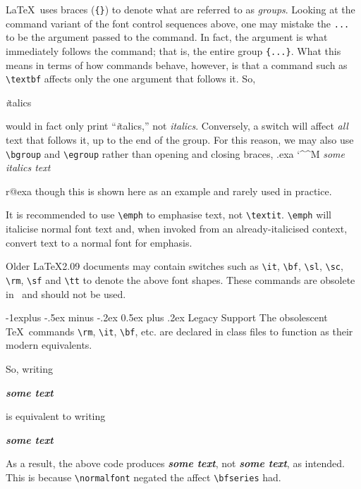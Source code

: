 \documentclass[10pt,landscape,letterpaper]{article}
\makeatletter
\renewcommand{\subsection}{\@startsection{subsection}{2}{0mm}%
	{-1explus -.5ex minus -.2ex}%
	{0.5ex plus .2ex}%
	{\normalfont\normalsize\bfseries}}
\newcounter{exacnt}
\newlength{\savefboxrule}
\newlength{\savefboxsep}
\newlength{\outdent}
\newenvironment{example}%
{\begingroup%
	\@bsphack
	\immediate\openout \example@out \jobname.exa
	\let\do\@makeother\dospecials\catcode`\^^M\active
	\def\verbatim@processline{%
		\immediate\write\example@out{\the\verbatim@line}}%
	\verbatim@start}%
{\immediate\closeout\example@out\@esphack\endgroup%
	\stepcounter{exacnt}%
	\setlength{\parindent}{0pt}%
	\par%
	\expandafter\ifx\csname r@exa\theexacnt\endcsname\relax\else
	\ifodd\HyPsd@pageref{exa\theexacnt}\hspace*{0pt}\else\hspace*{-\outdent}\fi%
	\fi
	\makebox[\linewidth][l]{%
		\begin{minipage}[c]{0.445\linewidth}%
			\small
		\end{minipage}%
		\hfill\hfill%
		\setlength{\savefboxrule}{\fboxrule}%
		\setlength{\fboxrule}{0.1pt}%
		\setlength{\savefboxsep}{\fboxsep}%
		\setlength{\fboxsep}{4pt}%
		\fbox{%
			\begin{minipage}{0.48\linewidth}%
				\setlength{\parskip}{1ex plus 0.4ex minus 0.2ex}%
				\begin{trivlist}\item\small
				\end{trivlist}
			\end{minipage}
		}%
	}\label{exa\theexacnt}%
\newline
}
\makeatother
\begin{document}
\begin{multicols*}{3}
\LaTeX\ uses braces (\verb|{}|) to denote what are referred to as \textit{groups}. Looking at the command variant of the font control sequences above, one may mistake the \verb|...| to be the argument passed to the command. In fact, the argument is what immediately follows the command; that is, the entire group \verb|{...}|. What this means in terms of how commands behave, however, is that a command such as \verb|\textbf| affects only the one argument that follows it. So, 
\begin{macrocode}
\textit italics
\end{macrocode}
would in fact only print ``\textit italics,'' not \textit{italics}. Conversely, a switch will affect \textit{all} text that follows it, up to the end of the group. For this reason, we may also use \verb|\bgroup| and \verb|\egroup| rather than opening and closing braces,
\begin{example}
\textit\bgroup some italics text\egroup
\end{example}
though this is shown here as an example and rarely used in practice. 

It is recommended to use \verb|\emph| to emphasise text, not \verb|\textit|. \verb|\emph| will italicise normal font text and, when invoked from an already-italicised context, convert text to a normal font for emphasis.


Older \LaTeX2.09 documents may contain switches such as \verb|\it|, \verb|\bf|, \verb|\sl|, \verb|\sc|, \verb|\rm|, \verb|\sf| and \verb|\tt| to denote the above font shapes. These commands are obsolete in \LaTeXe\ and should not be used.


\subsection{Legacy Support}
The obsolescent \TeX\ commands \verb|\rm|, \verb|\it|, \verb|\bf|, etc. are declared in class files to function as their modern equivalents.
\begin{macrocode}
\DeclareOldFontCommand{\rm}{\normalfont\rmfamily}{\mathrm}
\DeclareOldFontCommand{\bf}{\normalfont\bfseries}{\mathbf}
\DeclareOldFontCommand{\it}{\normalfont\itshape}{\mathit}
\end{macrocode}
So, writing
\begin{macrocode}
{\bf\it some text}
\end{macrocode}
is equivalent to writing
\begin{macrocode}
{\normalfont\bfseries\normalfont\itshape some text}
\end{macrocode}
As a result, the above code produces {\normalfont\bfseries\normalfont\itshape some text}, not {\bfseries\itshape some text}, as intended. This is because \verb|\normalfont| negated the affect \verb|\bfseries| had.


\end{multicols*}
\end{document}
